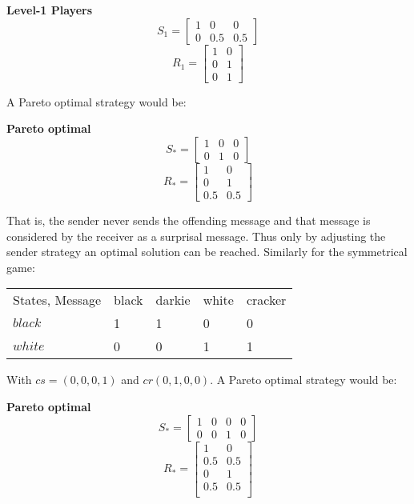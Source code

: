 \documentclass[10]{article}
\begin{document}
\textbf{Level-1 Players}\\
\begin{equation*}
S_1=
\begin{bmatrix}
1 & 0 & 0\\
0 & 0.5 & 0.5
\end{bmatrix}
\end{equation*}
\begin{equation*}
R_1=
\begin{bmatrix}
1 & 0\\
0 & 1\\
0 & 1
\end{bmatrix}
\end{equation*}

A Pareto optimal strategy would be:

\textbf{Pareto optimal}\\
\begin{equation*}
S_*=
\begin{bmatrix}
1 & 0 & 0\\
0 & 1 & 0
\end{bmatrix}
\end{equation*}
\begin{equation*}
R_*=
\begin{bmatrix}
1 & 0\\
0 & 1\\
0.5 & 0.5
\end{bmatrix}
\end{equation*}

That is, the sender never sends the offending message and that message is considered by the receiver as a surprisal message. Thus only by adjusting the sender strategy an optimal solution can be reached. Similarly for the symmetrical game:

\begin{table}[h]
\centering
\begin{tabular}{lllll}
States, Message & black & darkie & white & cracker \\
$black$  & 1      & 1    & 0        & 0   \\
$white$  & 0     & 0   & 1       & 1
\end{tabular}
\end{table}

With $cs=(0,0,0,1)$ and $cr(0,1,0,0)$. A Pareto optimal strategy would be:

\textbf{Pareto optimal}\\
\begin{equation*}
S_*=
\begin{bmatrix}
1 & 0 & 0 & 0\\
0 & 0 & 1 & 0
\end{bmatrix}
\end{equation*}
\begin{equation*}
R_*=
\begin{bmatrix}
1 & 0\\
0.5 & 0.5 \\
0 & 1\\
0.5 & 0.5 \\
\end{bmatrix}
\end{equation*}
\end{document}

